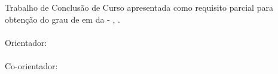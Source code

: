 %
%

\makeatletter
\begin{folhaderosto}
	\thispagestyle{empty}%
	
    \begin{center}
    
		\small\textbf{\expandafter\uppercase\expandafter{\imprimirnomeautor}}\\
		\vspace*{8.2 cm}%
		\normalsize\textbf{\expandafter\uppercase\expandafter{\imprimirtitulotb}}\\
		
    \end{center}
	
	\vspace*{0.35 cm}%
		    \large%
    		\hfill%
	    	\begin{minipage}{8 cm}%
	    		\begin{small} %
	    		\setlength{\baselineskip}{0.7\baselineskip}
				
		    	{Trabalho de Conclusão de Curso apresentada como requisito parcial para obtenção do grau de
		    	{\imprimirgrau } em {\imprimirprograma } da {\imprimirinstituicao}{ - }{\imprimirabreviatura},
		    	{\imprimirdepartamento}.}\\{
		    	}\\Orientador: {\imprimirtitulacaoorientador }{ }{\imprimirorientador}\\{
		    	}\\Co-orientador: {\imprimirtitulacaocoorientador }{ }{\imprimircoorientador}
				
				
				\end{small} %
		    \end{minipage}%
		    	
		    \vspace*{10 cm}%
		    
		    \begin{center} %
		    	\normalsize %
	    		\imprimirlocal\\
	    		\imprimirdata
	    	\end{center}%

\end{folhaderosto}
\makeatother
